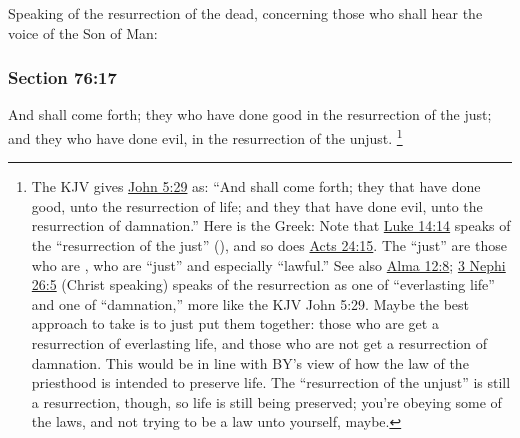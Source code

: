 		Speaking of the resurrection of the dead, concerning those who shall hear the voice of the Son of Man:


	\subsubsection{Section 76:17} %
		\label{DC76-17}

		And shall come forth; they who have done good in the resurrection of the just; and they who have done evil, in the resurrection of the unjust.%
			\footnote{%
				\label{DC76-17-john5}%
				The KJV gives \hyperref[JOHN-5-29]{John 5:29} as: ``And shall come forth; they that have done good, unto the resurrection of life; and they that have done evil, unto the resurrection of damnation.'' Here is the Greek:  Note that \hyperref[LUKE-14-14]{Luke 14:14} speaks of the ``resurrection of the just'' (), and so does \hyperref[ACTS-24-15]{Acts 24:15}. The ``just'' are those who are \hyperref[DIKAIOS]{}, who are ``just'' and especially ``lawful.'' See also \hyperref[ALMA-12-8]{Alma 12:8}; \hyperref[3NEPHI-26-5]{3 Nephi 26:5} (Christ speaking) speaks of the resurrection as one of ``everlasting life'' and one of ``damnation,'' more like the KJV John 5:29. Maybe the best approach to take is to just put them together: those who are  get a resurrection of everlasting life, and those who are not  get a resurrection of damnation. This would be in line with BY's view of how the law of the priesthood is intended to preserve life. The ``resurrection of the unjust'' is still a resurrection, though, so life is still being preserved; you're obeying some of the laws, and not trying to be a law unto yourself, maybe. 
				}


